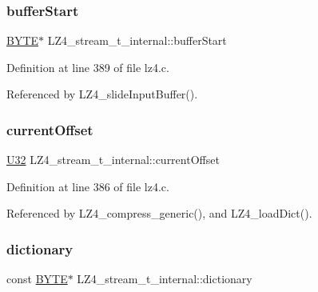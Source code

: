 \subsubsection{\texorpdfstring{buffer\+Start}{bufferStart}}
{\footnotesize\ttfamily \mbox{\hyperlink{lz4_8c_a4ae1dab0fb4b072a66584546209e7d58}{B\+Y\+TE}}$\ast$ L\+Z4\+\_\+stream\+\_\+t\+\_\+internal\+::buffer\+Start}



Definition at line 389 of file lz4.\+c.



Referenced by L\+Z4\+\_\+slide\+Input\+Buffer().

\mbox{\label{structLZ4__stream__t__internal_a2cdbcab32d03f345fd3c37af43c45523}} 
\subsubsection{\texorpdfstring{current\+Offset}{currentOffset}}
{\footnotesize\ttfamily \mbox{\hyperlink{lz4_8c_ac3df7cf3c8cb172a588adec881447d68}{U32}} L\+Z4\+\_\+stream\+\_\+t\+\_\+internal\+::current\+Offset}



Definition at line 386 of file lz4.\+c.



Referenced by L\+Z4\+\_\+compress\+\_\+generic(), and L\+Z4\+\_\+load\+Dict().

\mbox{\label{structLZ4__stream__t__internal_aea78f571ae3100b95df66b1d39c48aee}} 
\subsubsection{\texorpdfstring{dictionary}{dictionary}}
{\footnotesize\ttfamily const \mbox{\hyperlink{lz4_8c_a4ae1dab0fb4b072a66584546209e7d58}{B\+Y\+TE}}$\ast$ L\+Z4\+\_\+stream\+\_\+t\+\_\+internal\+::dictionary}




